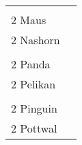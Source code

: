 \documentclass{article}\usepackage[ngerman]{babel}\usepackage{geometry}\usepackage{lmodern}
\begin{document}
\begin{table}[p]
  \begin{tabular}{ll}    \hspace{-2em}    \fbox{\begin{minipage}[t][6cm][t]{8cm}
        \fontsize{45}{54} \selectfont
        \phantom{ }\\
      \phantom{ }2 Maus    \end{minipage}}
    &
\fbox{\begin{minipage}[t][6cm][t]{8cm}
        \fontsize{45}{54} \selectfont
        \phantom{ }\\
        \phantom{ } 2 Nashorn      \end{minipage}}\\    \hspace{-2em}    \fbox{\begin{minipage}[t][6cm][t]{8cm}
        \fontsize{45}{54} \selectfont
        \phantom{ }\\
      \phantom{ }2 Panda    \end{minipage}}
    &
\fbox{\begin{minipage}[t][6cm][t]{8cm}
        \fontsize{45}{54} \selectfont
        \phantom{ }\\
        \phantom{ } 2 Pelikan      \end{minipage}}\\    \hspace{-2em}    \fbox{\begin{minipage}[t][6cm][t]{8cm}
        \fontsize{45}{54} \selectfont
        \phantom{ }\\
      \phantom{ }2 Pinguin    \end{minipage}}
    &
\fbox{\begin{minipage}[t][6cm][t]{8cm}
        \fontsize{45}{54} \selectfont
        \phantom{ }\\
        \phantom{ } 2 Pottwal      \end{minipage}}\\\end{tabular}
\end{table}
\end{document}
